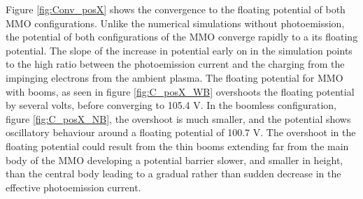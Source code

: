Figure \ref{fig:Conv_posX} shows the convergence to the floating potential of both MMO configurations. Unlike the numerical simulations without photoemission, the potential of both configurations of the MMO converge rapidly to a its floating potential. The slope of the increase in potential early on in the simulation points to the high ratio between the photoemission current and the charging from the impinging electrons from the ambient plasma. The floating potential for MMO with booms, as seen in figure \ref{fig:C_posX_WB} overshoots the floating potential by several volts, before converging to 105.4 V. In the boomless configuration, figure \ref{fig:C_posX_NB}, the overshoot is much smaller, and the potential shows oscillatory behaviour around a floating potential of 100.7 V. The overshoot in the floating potential could result from the thin booms extending far from the main body of the MMO developing a potential barrier slower, and smaller in height, than the central body leading to a gradual rather than sudden decrease in the effective photoemission current.



